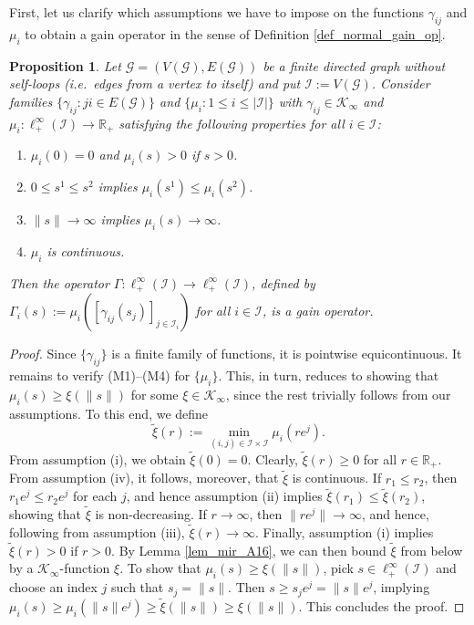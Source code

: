 \documentclass[10pt, oneside, a4paper]{article}
\newcommand{\R}{\mathbb{R}}
\newcommand{\tm}{\times}
\newcommand{\GC}{\mathcal{G}}
\newcommand{\IC}{\mathcal{I}}
\newcommand{\KC}{\mathcal{K}}
\newtheorem{proposition}{Proposition}[section]
\begin{document}
First, let us clarify which assumptions we have to impose on the functions $\gamma_{ij}$ and $\mu_i$ to obtain a gain operator in the sense of Definition \ref{def_normal_gain_op}.%

\begin{proposition}\label{prop_finitedim_gainop}
Let $\GC = (V(\GC),E(\GC))$ be a finite directed graph without self-loops (i.e.~edges from a vertex to itself) and put $\IC := V(\GC)$. Consider families $\{\gamma_{ij} : ji \in E(\GC)\}$ and $\{\mu_i : 1 \leq i \leq |\IC|\}$ with $\gamma_{ij} \in \KC_{\infty}$ and $\mu_i:\ell^{\infty}_+(\IC) \rightarrow \R_+$ satisfying the following properties for all $i \in \IC$:%
\begin{enumerate}
\item[(i)] $\mu_i(0) = 0$ and $\mu_i(s) > 0$ if $s > 0$.%
\item[(ii)] $0 \leq s^1 \leq s^2$ implies $\mu_i(s^1) \leq \mu_i(s^2)$.%
\item[(iii)] $\|s\| \rightarrow \infty$ implies $\mu_i(s) \rightarrow \infty$.%
\item[(iv)] $\mu_i$ is continuous.%
\end{enumerate}
Then the operator $\Gamma:\ell^{\infty}_+(\IC) \rightarrow \ell^{\infty}_+(\IC)$, defined by $\Gamma_i(s) := \mu_i([\gamma_{ij}(s_j)]_{j\in\IC_i})$ for all $i \in \IC$, is a gain operator.
\end{proposition}

\begin{proof}
Since $\{\gamma_{ij}\}$ is a finite family of functions, it is pointwise equicontinuous. It remains to verify (M1)--(M4) for $\{\mu_i\}$. This, in turn, reduces to showing that $\mu_i(s) \geq \xi(\|s\|)$ for some $\xi \in \KC_{\infty}$, since the rest trivially follows from our assumptions. To this end, we define%
\begin{equation*}
  \tilde{\xi}(r) := \min_{(i,j) \in \IC \tm \IC}\mu_i(re^j).%
\end{equation*}
From assumption (i), we obtain $\tilde{\xi}(0) = 0$. Clearly, $\tilde{\xi}(r) \geq 0$ for all $r \in \R_+$. From assumption (iv), it follows, moreover, that $\tilde{\xi}$ is continuous. If $r_1 \leq r_2$, then $r_1 e^j \leq r_2 e^j$ for each $j$, and hence assumption (ii) implies $\tilde{\xi}(r_1) \leq \tilde{\xi}(r_2)$, showing that $\tilde{\xi}$ is non-decreasing. If $r \rightarrow \infty$, then $\|re^j\| \rightarrow \infty$, and hence, following from assumption (iii), $\tilde{\xi}(r) \rightarrow \infty$. Finally, assumption (i) implies $\tilde{\xi}(r) > 0$ if $r > 0$. By Lemma \ref{lem_mir_A16}, we can then bound $\tilde{\xi}$ from below by a $\KC_{\infty}$-function $\xi$. To show that $\mu_i(s) \geq \xi(\|s\|)$, pick $s \in \ell^{\infty}_+(\IC)$ and choose an index $j$ such that $s_j = \|s\|$. Then $s \geq s_j e^j = \|s\|e^j$, implying $ \mu_i(s) \geq \mu_i(\|s\|e^j) \geq \tilde{\xi}(\|s\|) \geq \xi(\|s\|)$. This concludes the proof.
\end{proof}
\end{document}
